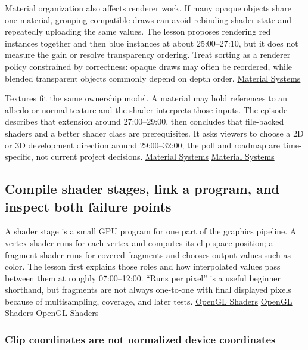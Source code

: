 Material organization also affects renderer work. If many opaque objects share one material, grouping compatible draws can avoid rebinding shader state and repeatedly uploading the same values. The lesson proposes rendering red instances together and then blue instances at about 25:00--27:10, but it does not measure the gain or resolve transparency ordering. Treat sorting as a renderer policy constrained by correctness: opaque draws may often be reordered, while blended transparent objects commonly depend on depth order. \href{https://www.youtube.com/watch?v=2k5FjtMNQsM&t=1500s}{Material Systems}

Textures fit the same ownership model. A material may hold references to an albedo or normal texture and the shader interprets those inputs. The episode describes that extension around 27:00--29:00, then concludes that file-backed shaders and a better shader class are prerequisites. It asks viewers to choose a 2D or 3D development direction around 29:00--32:00; the poll and roadmap are time-specific, not current project decisions. \href{https://www.youtube.com/watch?v=2k5FjtMNQsM&t=1620s}{Material Systems} \href{https://www.youtube.com/watch?v=2k5FjtMNQsM&t=1740s}{Material Systems}

\subsection{Compile shader stages, link a program, and inspect both failure points}\label{06-engine-ii-ch025-compile-shader-stages-link-a-program-and-inspect-both-failure-points}

A shader stage is a small GPU program for one part of the graphics pipeline. A vertex shader runs for each vertex and computes its clip-space position; a fragment shader runs for covered fragments and chooses output values such as color. The lesson first explains those roles and how interpolated values pass between them at roughly 07:00--12:00. ``Runs per pixel'' is a useful beginner shorthand, but fragments are not always one-to-one with final displayed pixels because of multisampling, coverage, and later tests. \href{https://www.youtube.com/watch?v=QBCCHm_9HV8&t=420s}{OpenGL Shaders} \href{https://www.youtube.com/watch?v=QBCCHm_9HV8&t=540s}{OpenGL Shaders} \href{https://www.youtube.com/watch?v=QBCCHm_9HV8&t=660s}{OpenGL Shaders}

\subsubsection{Clip coordinates are not normalized device coordinates}\label{06-engine-ii-ch025-clip-coordinates-are-not-normalized-device-coordinates}

